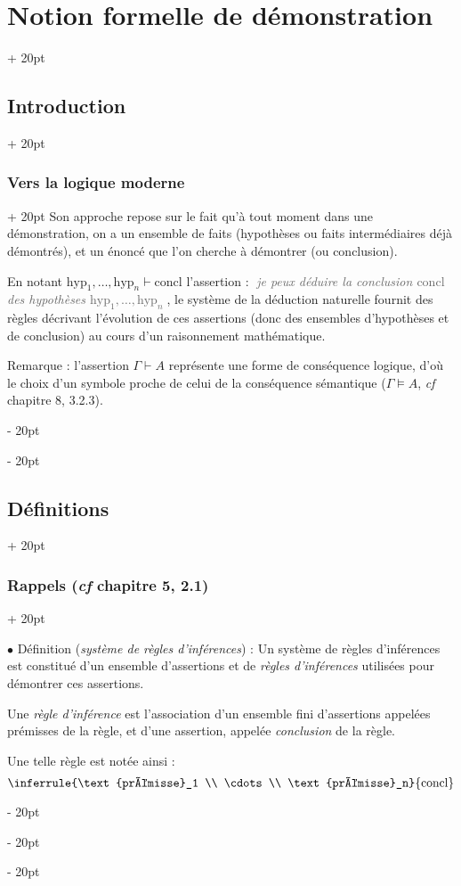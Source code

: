 \documentclass[a4paper, 12pt, twoside]{article}
\newcommand{\simplecit}[1]{\guillemotleft$\;$#1$\;$\guillemotright}
\newcommand{\cit}[1]{\simplecit{\textcolor{656565}{#1}}}
\newcommand{\quo}[1]{\cit{\it #1}}
\newcommand{\ind}[1][20pt]{\advance\leftskip + #1}
\newcommand{\deind}[1][20pt]{\advance\leftskip - #1}
\newenvironment{indt}[2][20pt]{#2 \par \ind[#1]}{\par \deind} %
\begin{document}
\begin{indt}{\section{Notion formelle de démonstration}}
\begin{indt}{\subsection{Introduction}}
\begin{indt}{\subsubsection{Vers la logique moderne}}
                Son approche repose sur le fait qu'à tout moment dans une démonstration, on a un ensemble de faits (hypothèses ou faits intermédiaires déjà démontrés), et un énoncé que l'on cherche à démontrer (ou conclusion).

                En notant $\mathrm{hyp}_1, \ldots, \mathrm{hyp}_n \vdash \mathrm{concl}$ l'assertion : \quo{je peux déduire la conclusion $\mathrm{concl}$ des hypothèses $\mathrm{hyp}_1, \ldots, \mathrm{hyp}_n$}, le système de la déduction naturelle fournit des règles décrivant l'évolution de ces assertions (donc des ensembles d'hypothèses et de conclusion) au cours d'un raisonnement mathématique.

                \vspace{12pt}
                
                Remarque : l'assertion $\Gamma \vdash A$ représente une forme de conséquence logique, d'où le choix d'un symbole proche de celui de la conséquence sémantique ($\Gamma \vDash A$, \textit{cf} chapitre 8, 3.2.3).
            \end{indt}
        \end{indt}

        \vspace{12pt}
        
        \begin{indt}{\subsection{Définitions}}
            \begin{indt}{\subsubsection{Rappels (\textit{cf} chapitre 5, 2.1)}}
                \label{1.2.1}

                $\bullet$ Définition (\emph{système de règles d'inférences}) :
                Un système de règles d'inférences est constitué d'un ensemble d'assertions et de \emph{règles d'inférences} utilisées pour démontrer ces assertions.

                Une \emph{règle d'inférence} est l'association d'un ensemble fini d'assertions appelées prémisses de la règle, et d'une assertion, appelée \emph{conclusion} de la règle.

                Une telle règle est notée ainsi :
                \[
                    \inferrule{\text{prémisse}_1 \\ \cdots \\ \text{prémisse}_n}{\mathrm{concl}}
                \]


\end{indt}
\end{indt}
\end{indt}
\end{document}
